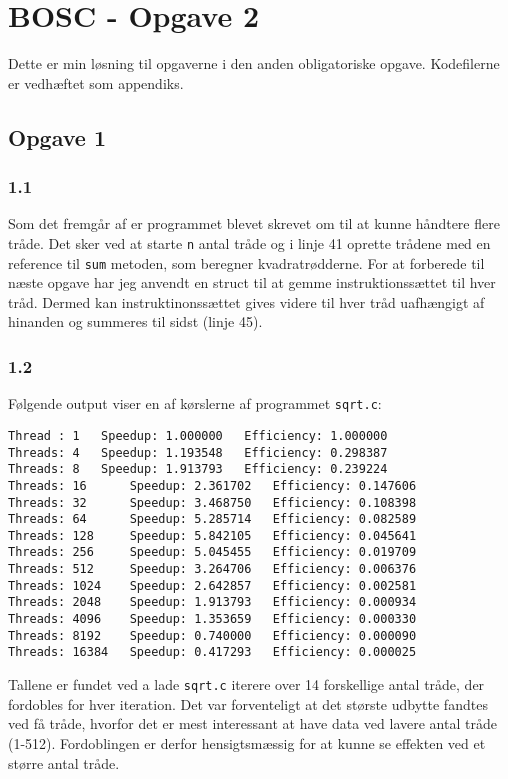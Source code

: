 \documentclass{article}
\begin{document}
\section*{BOSC - Opgave 2}
Dette er min løsning til opgaverne i den anden obligatoriske opgave. Kodefilerne er vedhæftet som appendiks. 

\subsection*{Opgave 1}
\subsubsection*{1.1}
Som det fremgår af  er programmet blevet skrevet om til at kunne håndtere flere tråde. Det sker ved at starte \texttt{n} antal tråde og i linje 41 oprette trådene med en reference til \texttt{sum} metoden, som beregner kvadratrødderne. For at forberede til næste opgave har jeg anvendt en struct til at gemme instruktionssættet til hver tråd. Dermed kan instruktinonssættet gives videre til hver tråd uafhængigt af hinanden og summeres til sidst (linje 45).
\subsubsection*{1.2} 
Følgende output viser en af kørslerne af programmet \texttt{sqrt.c}:
\begin{verbatim}
Thread : 1 	 Speedup: 1.000000 	 Efficiency: 1.000000
Threads: 4 	 Speedup: 1.193548 	 Efficiency: 0.298387
Threads: 8 	 Speedup: 1.913793 	 Efficiency: 0.239224
Threads: 16 	 Speedup: 2.361702 	 Efficiency: 0.147606
Threads: 32 	 Speedup: 3.468750 	 Efficiency: 0.108398
Threads: 64 	 Speedup: 5.285714 	 Efficiency: 0.082589
Threads: 128 	 Speedup: 5.842105 	 Efficiency: 0.045641
Threads: 256 	 Speedup: 5.045455 	 Efficiency: 0.019709
Threads: 512 	 Speedup: 3.264706 	 Efficiency: 0.006376
Threads: 1024 	 Speedup: 2.642857 	 Efficiency: 0.002581
Threads: 2048 	 Speedup: 1.913793 	 Efficiency: 0.000934
Threads: 4096 	 Speedup: 1.353659 	 Efficiency: 0.000330
Threads: 8192 	 Speedup: 0.740000 	 Efficiency: 0.000090
Threads: 16384 	 Speedup: 0.417293 	 Efficiency: 0.000025
\end{verbatim}
Tallene er fundet ved a lade \texttt{sqrt.c} iterere over 14 forskellige antal tråde, der fordobles for hver iteration. Det var forventeligt at det største udbytte fandtes ved få tråde, hvorfor det er mest interessant at have data ved lavere antal tråde (1-512). Fordoblingen er derfor hensigtsmæssig for at kunne se effekten ved et større antal tråde.
\end{document}

